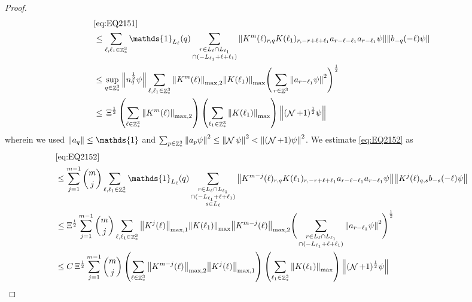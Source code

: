 \documentclass[sn-mathphys, Numbered ,a4paper]{sn-jnl}%
\DeclareMathOperator{\Z}{\mathbb{Z}}
\DeclareMathOperator{\NN}{\mathcal{N}}
\newcommand{\half}{\frac{1}{2}}
\theoremstyle{plain}
\theoremstyle{definition}
\theoremstyle{remark}
\theoremstyle{plain}
\theoremstyle{definition}
\theoremstyle{remark}
\begin{document}
\begin{proof}
\begin{align}
    &\eqref{eq:EQ2151}\nonumber\\
	&\leq \sum\limits_{\ell, \ell_1\in \Z^3_*} \mathds{1}_{L_{\ell}}(q) \sum\limits_{\substack{r\in L_{\ell} \cap L_{\ell_1} \\ \cap (-L_{\ell_1}+\ell+\ell_1)}} \norm{K^m(\ell)_{r,q} K(\ell_1)_{r,-r+\ell+\ell_1} a_{r-\ell-\ell_1} a_{r-\ell_1} \psi}\norm{  b_{-q}(-\ell) \psi}\nonumber\\
	&\leq \sup\limits_{q \in \Z^3_*} \norm{ n_{q}^\half \psi} \sum\limits_{\ell, \ell_1\in \Z^3_*} \norm{K^m(\ell)}_{\mathrm{max,2}} \norm{K(\ell_1)}_{\mathrm{max}} \Bigg( \sum\limits_{r\in \Z^3} \norm{  a_{r-\ell_1} \psi}^2\Bigg)^\half\nonumber\\    	
	&\leq \, \Xi^\half \left(\sum\limits_{\ell \in \Z^3_*} \norm{K^m(\ell)}_{\mathrm{max,2}}\right)\left( \sum\limits_{\ell_1\in \Z^3_*} \norm{ K(\ell_1)}_{\mathrm{max}} \right) \norm{ (\NN+1)^\half \psi }\label{eq:estEQ2151}
\end{align} 
wherein we used $\norm{a_q} \leq \mathds{1}$ and $\sum_{p\in \Z^3_*}\norm{a_p \psi}^2\leq\norm{\NN\psi}^2<\norm{(\NN+1)\psi}^2$. We estimate \eqref{eq:EQ2152} as
\begin{align}
	&\eqref{eq:EQ2152}\nonumber\\
	&\leq  \sum\limits_{j=1}^{m-1} {{m}\choose j} \sum\limits_{\ell, \ell_1\in \Z^3_*}\mathds{1}_{L_{\ell}}(q) \sum\limits_{\substack{r\in L_{\ell} \cap L_{\ell_1}\\ \cap (-L_{\ell_1}+\ell+\ell_1)\\ s \in L_{\ell}}}  \norm{ K^{m-j}(\ell)_{r,q} K(\ell_1)_{r,-r+\ell+\ell_1}  a_{r-\ell-\ell_1} a_{r-\ell_1} \psi}\norm{ K^j(\ell)_{q,s}  b_{-s}(-\ell) \psi }\nonumber\\
	&\leq \Xi^\half \sum\limits_{j=1}^{m-1} {{m}\choose j} \sum\limits_{\ell, \ell_1\in \Z^3_*} \norm{K^{j}(\ell)}_{\mathrm{max,1}}  \norm{K(\ell_1)}_{\mathrm{max}} \norm{K^{m-j}(\ell)}_{\mathrm{max,2}} \Bigg(\sum\limits_{\substack{r\in L_{\ell} \cap L_{\ell_1}\\ \cap (-L_{\ell_1}+\ell+\ell_1)}} \norm{ a_{r-\ell_1} \psi}^2\Bigg)^\half\nonumber\\
	&\leq  C\,\Xi^\half  \sum\limits_{j=1}^{m-1} {{m}\choose j} \left( \sum\limits_{\ell \in \Z^3_*} \norm{K^{m-j}(\ell)}_{\mathrm{max,2}} \norm{ K^{j}(\ell)}_{\mathrm{max},1}\right) \left( \sum\limits_{ \ell_1\in \Z^3_*}\norm{ K(\ell_1) }_{\mathrm{max}} \right) \norm{ (\NN+1)^\half \psi }\label{eq:estEQ2152}
\end{align}
    

\end{proof}
\end{document}
